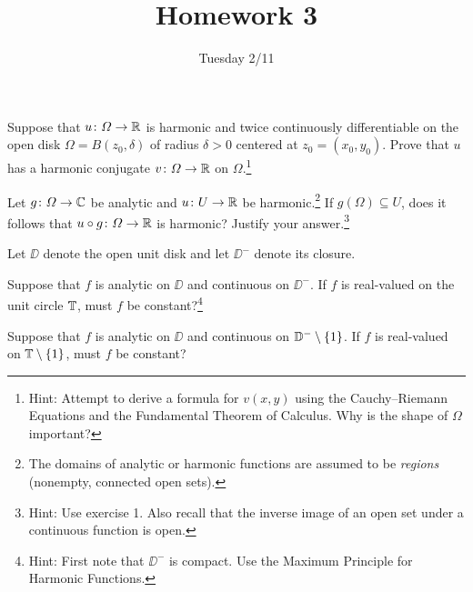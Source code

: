 \documentclass{../math135}
\title{Homework 3}
\author{}
\date{Tuesday 2/11}
\begin{document}
\begin{exercise}
	Suppose that \(u \colon \Omega\to\mathbb R\) is harmonic and twice
  continuously differentiable on the open disk
  \(\Omega = B(z_0, \delta)\) of radius \(\delta > 0\) centered at
  \(z_0 = (x_0, y_0)\).  Prove that \(u\) has a harmonic conjugate
  \(v \colon \Omega\to\mathbb R\) on \(\Omega\).\footnote{Hint: Attempt to
    derive a formula for \(v(x, y)\) using the Cauchy--Riemann
    Equations and the Fundamental Theorem of Calculus.  Why is the
    shape of \(\Omega\) important?}

  \begin{solution}
  \end{solution}

\end{exercise}

\begin{exercise}
	Let \(g \colon \Omega\to\mathbb C\) be analytic and \(u \colon U\to\mathbb R\)
  be harmonic.\footnote{The domains of analytic or harmonic functions
    are assumed to be \emph{regions} (nonempty, connected open sets).}
  If \(g(\Omega) \subseteq U\), does it follows that
  \(u \circ g \colon \Omega\to\mathbb R\) is harmonic?  Justify your
  answer.\footnote{Hint: Use exercise 1.  Also recall that the inverse
    image of an open set under a continuous function is open.}%

  \begin{solution}
  \end{solution}

\end{exercise}

\begin{exercise}
  Let \(\DD\) denote the open unit disk and let \(\DD^-\) denote its
  closure.
  \begin{problems}
	\item Suppose that \(f\) is analytic on \(\DD\) and continuous on
    \(\DD^-\).  If \(f\) is real-valued on the unit circle \(\mathbb T\),
    must \(f\) be constant?\footnote{Hint: First note that \(\DD^-\)
      is compact.  Use the Maximum Principle for Harmonic Functions.}%

    \begin{solution}
    \end{solution}

	\item Suppose that \(f\) is analytic on \(\DD\) and continuous on
    \(\mathbb D^- \setminus \{1\}\).  If \(f\) is real-valued on
    \(\mathbb T \setminus \{1\}\), must \(f\) be constant?

    \begin{solution}
    \end{solution}

  \end{problems}
\end{exercise}
\end{document}
